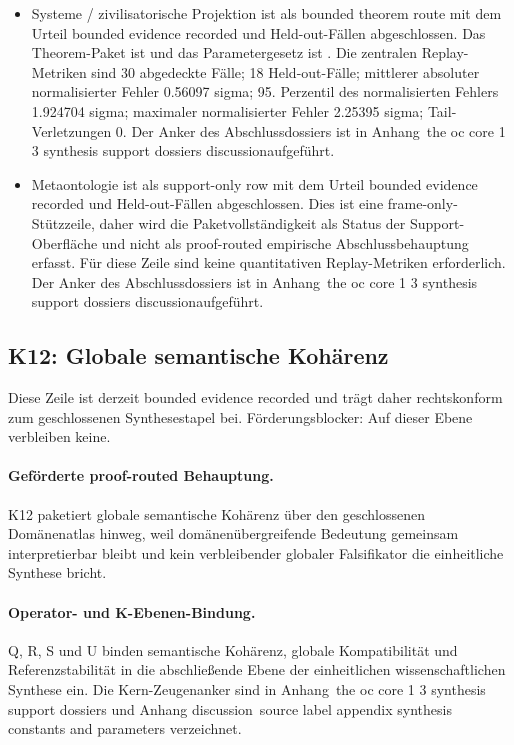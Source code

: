 \begin{itemize}[leftmargin=1.6em,nosep]
\item Systeme / zivilisatorische Projektion ist als bounded theorem route mit dem Urteil bounded evidence recorded und  Held-out-Fällen abgeschlossen. Das Theorem-Paket ist  und das Parametergesetz ist . Die zentralen Replay-Metriken sind 30 abgedeckte Fälle; 18 Held-out-Fälle; mittlerer absoluter normalisierter Fehler 0.56097 sigma; 95. Perzentil des normalisierten Fehlers 1.924704 sigma; maximaler normalisierter Fehler 2.25395 sigma; Tail-Verletzungen 0. Der Anker des Abschlussdossiers ist in Anhang~the oc core 1 3 synthesis support dossiers discussionaufgeführt.
\item Metaontologie ist als support-only row mit dem Urteil bounded evidence recorded und  Held-out-Fällen abgeschlossen. Dies ist eine frame-only-Stützzeile, daher wird die Paketvollständigkeit als Status der Support-Oberfläche und nicht als proof-routed empirische Abschlussbehauptung erfasst. Für diese Zeile sind keine quantitativen Replay-Metriken erforderlich. Der Anker des Abschlussdossiers ist in Anhang~the oc core 1 3 synthesis support dossiers discussionaufgeführt.
\end{itemize}

\subsection{K12: Globale semantische Kohärenz}
\label{sec:oc-core-1-3-synthesis-k12}
Diese Zeile ist derzeit bounded evidence recorded und trägt daher rechtskonform zum geschlossenen Synthesestapel bei.
Förderungsblocker: Auf dieser Ebene verbleiben keine.

\paragraph{Geförderte proof-routed Behauptung.}
K12 paketiert globale semantische Kohärenz über den geschlossenen Domänenatlas hinweg, weil domänenübergreifende Bedeutung gemeinsam interpretierbar bleibt und kein verbleibender globaler Falsifikator die einheitliche Synthese bricht.

\paragraph{Operator- und K-Ebenen-Bindung.}
Q, R, S und U binden semantische Kohärenz, globale Kompatibilität und Referenzstabilität in die abschließende Ebene der einheitlichen wissenschaftlichen Synthese ein.
Die Kern-Zeugenanker sind in Anhang~the oc core 1 3 synthesis support dossiers und Anhang discussion~source label appendix synthesis constants and parameters verzeichnet.

